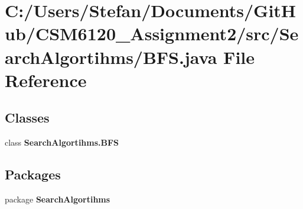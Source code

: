 \section{C\+:/\+Users/\+Stefan/\+Documents/\+Git\+Hub/\+C\+S\+M6120\+\_\+\+Assignment2/src/\+Search\+Algortihms/\+B\+F\+S.java File Reference}
\label{_b_f_s_8java}
\subsection*{Classes}
\begin{DoxyCompactItemize}
\item 
class {\bf Search\+Algortihms.\+B\+F\+S}
\end{DoxyCompactItemize}
\subsection*{Packages}
\begin{DoxyCompactItemize}
\item 
package {\bf Search\+Algortihms}
\end{DoxyCompactItemize}
